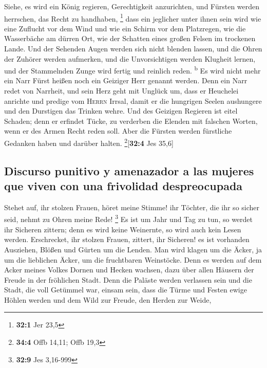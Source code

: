  Siehe, es wird ein König regieren, Gerechtigkeit
anzurichten, und Fürsten werden herrschen, das Recht zu handhaben,
\footnote{\textbf{32:1} Jer 23,5}  dass ein jeglicher
unter ihnen sein wird wie eine Zuflucht vor dem Wind und wie ein Schirm
vor dem Platzregen, wie die Wasserbäche am dürren Ort, wie der Schatten
eines großen Felsen im trockenen Lande.  Und der Sehenden
Augen werden sich nicht blenden lassen, und die Ohren der Zuhörer werden
aufmerken,  und die Unvorsichtigen werden Klugheit lernen,
und der Stammelnden Zunge wird fertig und reinlich reden.
\textsuperscript{b}  Es wird nicht mehr ein Narr Fürst
heißen noch ein Geiziger Herr genannt werden.  Denn ein
Narr redet von Narrheit, und sein Herz geht mit Unglück um, dass er
Heuchelei anrichte und predige vom \textsc{Herrn} Irrsal, damit er die
hungrigen Seelen aushungere und den Durstigen das Trinken wehre.
 Und des Geizigen Regieren ist eitel Schaden; denn er
erfindet Tücke, zu verderben die Elenden mit falschen Worten, wenn er
des Armen Recht reden soll.  Aber die Fürsten werden
fürstliche Gedanken haben und darüber halten.
\footnote{\textbf{34:4} Offb 14,11; Offb 19,3}{[}\textbf{32:4} Jes
35,6{]}

\hypertarget{discurso-punitivo-y-amenazador-a-las-mujeres-que-viven-con-una-frivolidad-despreocupada}{%
\subsection{Discurso punitivo y amenazador a las mujeres que viven con
una frivolidad
despreocupada}\label{discurso-punitivo-y-amenazador-a-las-mujeres-que-viven-con-una-frivolidad-despreocupada}}

 Stehet auf, ihr stolzen Frauen, höret meine Stimme! ihr
Töchter, die ihr so sicher seid, nehmt zu Ohren meine Rede! \footnote{\textbf{32:9}
  Jes 3,16-999}  Es ist um Jahr und Tag zu tun, so werdet
ihr Sicheren zittern; denn es wird keine Weinernte, so wird auch kein
Lesen werden.  Erschrecket, ihr stolzen Frauen, zittert,
ihr Sicheren! es ist vorhanden Ausziehen, Blößen und Gürten um die
Lenden.  Man wird klagen um die Äcker, ja um die
lieblichen Äcker, um die fruchtbaren Weinstöcke.  Denn es
werden auf dem Acker meines Volkes Dornen und Hecken wachsen, dazu über
allen Häusern der Freude in der fröhlichen Stadt.  Denn
die Paläste werden verlassen sein und die Stadt, die voll Getümmel war,
einsam sein, dass die Türme und Festen ewige Höhlen werden und dem Wild
zur Freude, den Herden zur Weide,

